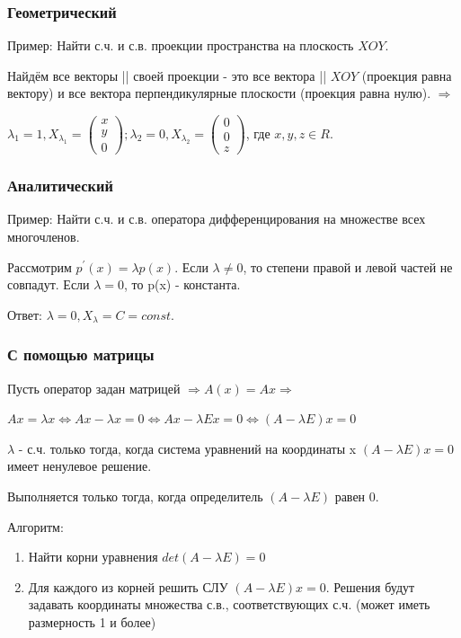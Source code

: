 \documentclass[12pt]{article}
\begin{document}
\subsubsection{Геометрический}
Пример: Найти с.ч. и с.в. проекции пространства на плоскость $XOY$.

Найдём все векторы || своей проекции - это все вектора || $XOY$ (проекция равна вектору) и все вектора перпендикулярные плоскости (проекция равна нулю). $\Rightarrow$

$\lambda_1 = 1, X_{\lambda_1} = \left(\begin{array}{c}
            x \\
            y \\
            0
        \end{array} \right); \lambda_2 = 0, X_{\lambda_2} = \left(\begin{array}{c}
            0 \\
            0 \\
            z
        \end{array} \right)$, где $x, y, z \in R$.
\subsubsection{Аналитический}
Пример: Найти с.ч. и с.в. оператора дифференцирования на множестве всех многочленов.

Рассмотрим $p^\prime(x) = \lambda p(x)$. Если $\lambda \neq 0$, то степени правой и левой частей не совпадут. Если $\lambda = 0$, то p(x) - константа.

Ответ: $\lambda = 0, X_\lambda = C = const$.

\subsubsection{С помощью матрицы}
Пусть оператор задан матрицей $\Rightarrow A(x) = Ax \Rightarrow$

\begin{center}
    $Ax = \lambda x \Leftrightarrow Ax - \lambda x = 0 \Leftrightarrow Ax - \lambda Ex = 0 \Leftrightarrow (A - \lambda E)x = 0$
\end{center}

$\lambda$ - с.ч. только тогда, когда система уравнений на координаты x $(A - \lambda E)x = 0$ имеет ненулевое решение.

Выполняется только тогда, когда определитель $(A - \lambda E)$ равен 0.

Алгоритм: \begin{enumerate}
    \item Найти корни уравнения $det(A - \lambda E) = 0$
    \item Для каждого из корней решить СЛУ $(A - \lambda E)x = 0$. Решения будут задавать координаты множества с.в., соответствующих с.ч. (может иметь размерность 1 и более)
\end{enumerate}
\end{document}
